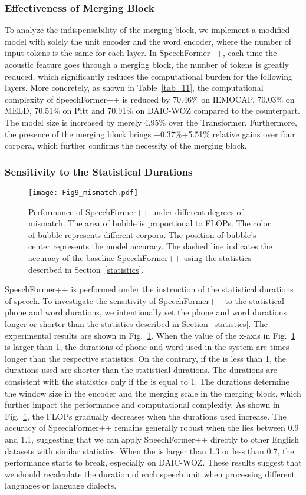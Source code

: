\documentclass[lettersize,journal]{IEEEtran}
\begin{document}
\subsubsection{Effectiveness of Merging Block} To analyze the indispensability of the merging block, we implement a modified model with solely the unit encoder and the word encoder, where the number of input tokens is the same for each layer. In SpeechFormer++, each time the acoustic feature goes through a merging block, the number of tokens is greatly reduced, which significantly reduces the computational burden for the following layers. More concretely, as shown in Table~\ref{tab_11}, the computational complexity of SpeechFormer++ is reduced by 70.46\% on IEMOCAP, 70.03\% on MELD, 70.51\% on Pitt and 70.91\% on DAIC-WOZ compared to the counterpart. The model size is increased by merely 4.95\% over the Transformer. Furthermore, the presence of the merging block brings +0.37\%+5.51\% relative gains over four corpora, which further confirms the necessity of the merging block.

\subsubsection{Sensitivity to the Statistical Durations}

\begin{figure}[t]
\centering
\texttt{[image: Fig9\_mismatch.pdf]}
\caption{Performance of SpeechFormer++ under different degrees of mismatch. The area of bubble is proportional to FLOPs. The color of bubble represents different corpora. The position of bubble's center represents the model accuracy. The dashed line indicates the accuracy of the baseline SpeechFormer++ using the statistics described in Section~\ref{statistics}.}
\label{fig_7}
\end{figure}

SpeechFormer++ is performed under the instruction of the statistical durations of speech. To investigate the sensitivity of SpeechFormer++ to the statistical phone and word durations, we intentionally set the phone and word durations longer or shorter than the statistics described in Section~\ref{statistics}. The experimental results are shown in Fig.~\ref{fig_7}. When the value of the x-axis  in Fig.~\ref{fig_7} is larger than 1, the durations of phone and word used in the system are  times longer than the respective statistics. On the contrary, if the  is less than 1, the durations used are shorter than the statistical durations. The durations are consistent with the statistics only if the  is equal to 1. The durations determine the window size in the encoder and the merging scale in the merging block, which further impact the performance and computational complexity. As shown in Fig.~\ref{fig_7}, the FLOPs gradually decreases when the durations used increase. The accuracy of SpeechFormer++ remains generally robust when the  lies between 0.9 and 1.1, suggesting that we can apply SpeechFormer++ directly to other English datasets with similar statistics. When the  is larger than 1.3 or less than 0.7, the performance starts to break, especially on DAIC-WOZ. These results suggest that we should recalculate the duration of each speech unit when processing different languages or language dialects.
\end{document}
